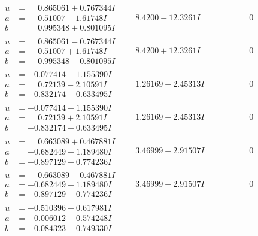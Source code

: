 \documentclass[1p]{elsarticle_modified}
\theoremstyle{definition}
\begin{document}
$$\begin{array}{c|c|c}
\begin{aligned}
u &= \phantom{-}0.865061 + 0.767344 I \\
a &= \phantom{-}0.51007 - 1.61748 I \\
b &= \phantom{-}0.995348 + 0.801095 I\end{aligned}
 & \phantom{-}8.4200 - 12.3261 I & \phantom{-0.000000 } 0 \\ \hline\begin{aligned}
u &= \phantom{-}0.865061 - 0.767344 I \\
a &= \phantom{-}0.51007 + 1.61748 I \\
b &= \phantom{-}0.995348 - 0.801095 I\end{aligned}
 & \phantom{-}8.4200 + 12.3261 I & \phantom{-0.000000 } 0 \\ \hline\begin{aligned}
u &= -0.077414 + 1.155390 I \\
a &= \phantom{-}0.72139 - 2.10591 I \\
b &= -0.832174 + 0.633495 I\end{aligned}
 & \phantom{-}1.26169 + 2.45313 I & \phantom{-0.000000 } 0 \\ \hline\begin{aligned}
u &= -0.077414 - 1.155390 I \\
a &= \phantom{-}0.72139 + 2.10591 I \\
b &= -0.832174 - 0.633495 I\end{aligned}
 & \phantom{-}1.26169 - 2.45313 I & \phantom{-0.000000 } 0 \\ \hline\begin{aligned}
u &= \phantom{-}0.663089 + 0.467881 I \\
a &= -0.682449 + 1.189480 I \\
b &= -0.897129 - 0.774236 I\end{aligned}
 & \phantom{-}3.46999 - 2.91507 I & \phantom{-0.000000 } 0 \\ \hline\begin{aligned}
u &= \phantom{-}0.663089 - 0.467881 I \\
a &= -0.682449 - 1.189480 I \\
b &= -0.897129 + 0.774236 I\end{aligned}
 & \phantom{-}3.46999 + 2.91507 I & \phantom{-0.000000 } 0 \\ \hline\begin{aligned}
u &= -0.510396 + 0.617981 I \\
a &= -0.006012 + 0.574248 I \\
b &= -0.084323 - 0.749330 I\end{aligned}

\end{array}$$
\end{document}
